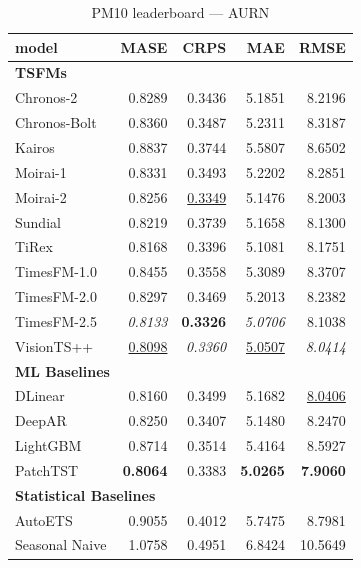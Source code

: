 \begin{table}[H]
\caption{PM10 leaderboard --- AURN}
\centering
\begin{small}
\begin{tabular}{lrrrr}
\toprule
model & MASE & CRPS & MAE & RMSE \\
\midrule
\multicolumn{5}{l}{\textbf{TSFMs}} \\
Chronos-2 & 0.8289 & 0.3436 & 5.1851 & 8.2196 \\
Chronos-Bolt & 0.8360 & 0.3487 & 5.2311 & 8.3187 \\
Kairos & 0.8837 & 0.3744 & 5.5807 & 8.6502 \\
Moirai-1 & 0.8331 & 0.3493 & 5.2202 & 8.2851 \\
Moirai-2 & 0.8256 & \underline{0.3349} & 5.1476 & 8.2003 \\
Sundial & 0.8219 & 0.3739 & 5.1658 & 8.1300 \\
TiRex & 0.8168 & 0.3396 & 5.1081 & 8.1751 \\
TimesFM-1.0 & 0.8455 & 0.3558 & 5.3089 & 8.3707 \\
TimesFM-2.0 & 0.8297 & 0.3469 & 5.2013 & 8.2382 \\
TimesFM-2.5 & \textit{0.8133} & \textbf{0.3326} & \textit{5.0706} & 8.1038 \\
VisionTS++ & \underline{0.8098} & \textit{0.3360} & \underline{5.0507} & \textit{8.0414} \\
\midrule
\multicolumn{5}{l}{\textbf{ML Baselines}} \\
DLinear & 0.8160 & 0.3499 & 5.1682 & \underline{8.0406} \\
DeepAR & 0.8250 & 0.3407 & 5.1480 & 8.2470 \\
LightGBM & 0.8714 & 0.3514 & 5.4164 & 8.5927 \\
PatchTST & \textbf{0.8064} & 0.3383 & \textbf{5.0265} & \textbf{7.9060} \\
\midrule
\multicolumn{5}{l}{\textbf{Statistical Baselines}} \\
AutoETS & 0.9055 & 0.4012 & 5.7475 & 8.7981 \\
Seasonal Naive & 1.0758 & 0.4951 & 6.8424 & 10.5649 \\
\bottomrule
\end{tabular}
\end{small}
\end{table}